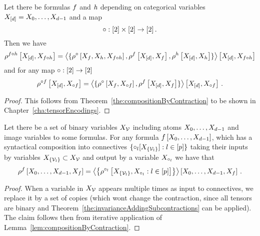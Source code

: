 \begin{lemma}\label{lem:compositionByContraction}
	Let there be formulas $f$ and $h$ depending on categorical variables $X_{[d]}=X_{0},\ldots,X_{d-1}$ and a map 
		\[ \circ: [2]\times[2] \rightarrow[2] \, . \]
	Then we have
	\begin{align*}
		\rho^{f\circ h}\left[X_{[d]},X_{f\circ h}\right]
		= \left\langle \{
		\rho^{\circ}\left[X_{f},X_{h},X_{f\circ h}\right],
		\rho^{f}\left[X_{[d]},X_{f}\right],
		\rho^{h}\left[X_{[d]},X_{h}\right] 
		\}\right\rangle \left[ 
		X_{[d]},X_{f\circ h}
		 \right]
	\end{align*}
	and for any map $\circ: [2] \rightarrow[2]$
	\begin{align*}
		\rho^{\circ f}\left[X_{[d]},X_{\circ f}\right]
		= \left\langle \{
		\rho^{\circ}\left[X_{f},X_{\circ f}\right],
		\rho^{f}\left[X_{[d]},X_{f}\right]
		\}\right\rangle \left[ 
		X_{[d]},X_{\circ f}
		 \right] \, . 
	\end{align*}
\end{lemma}
\begin{proof}
	This follows from Theorem~\ref{the:compositionByContraction} to be shown in Chapter~\ref{cha:tensorEncodings}.
\end{proof}


\begin{theorem}\label{the:compositionByContraction}
	Let there be a set of binary variables $X_{\mathcal{V}}$ including atoms $X_{0},\ldots,X_{d-1}$ and image variables to some formulas.
	For any formula $f\left[X_{0},\ldots,X_{d-1}\right]$, which has a syntactical composition into connectives $\{\circ_{l}[X_{\{\mathcal{V}_l \}}] : l \in [p]\}$ taking their inputs by variables $X_{\{\mathcal{V}_l \}}\subset X_{\mathcal{V}}$ and output by a variable $X_{\circ_l}$
	we have that
	\begin{align*}
		\rho^{f}\left[X_{0},\ldots,X_{d-1},X_{f}\right] =
		\left\langle \left\{
		\rho^{\circ_l}\left[X_{\{\mathcal{V}_l \}}, X_{\circ_l} : l \in [p] \right]
		\right\} \right\rangle \left[ X_{0},\ldots,X_{d-1},X_{f} \right] \, . 
	\end{align*}
\end{theorem}
\begin{proof}
	When a variable in $X_{\mathcal{V}}$ appears multiple times as input to connectives, we replace it by a set of copies (which wont change the contraction, since all tensors are binary and Theorem~\ref{the:invarianceAddingSubcontractions} can be applied).
	The claim follows then from iterative application of Lemma~\ref{lem:compositionByContraction}.
\end{proof}


